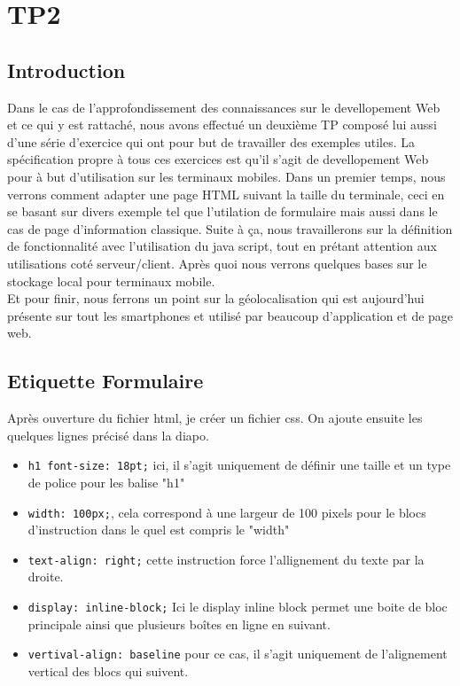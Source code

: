 \chapter{TP2}
\section{Introduction}
Dans le cas de l'approfondissement des connaissances sur le devellopement Web et ce qui y est rattaché, nous avons effectué un deuxième TP composé lui aussi d'une série d'exercice qui ont pour but de travailler des exemples utiles. La spécification propre à tous ces exercices est qu'il s'agit de devellopement Web pour à but d'utilisation sur les terminaux mobiles. Dans un premier temps, nous verrons comment adapter une page HTML suivant la taille du terminale, ceci en se basant sur divers exemple tel que l'utilation de formulaire mais aussi dans le cas de page d'information classique. Suite à ça, nous travaillerons sur la définition de fonctionnalité avec l'utilisation du java script, tout en prétant attention aux utilisations coté serveur/client. Après quoi nous verrons quelques bases sur le stockage local pour terminaux mobile.\\
Et pour finir, nous ferrons un point sur la géolocalisation qui est aujourd'hui présente sur tout les smartphones et utilisé par beaucoup d'application et de page web.

\section{Etiquette Formulaire}
Après ouverture du fichier html, je créer un fichier css. On ajoute ensuite les quelques lignes précisé dans la diapo.
\begin{itemize}
\item \texttt{h1 {font-size: 18pt;}} ici, il s'agit uniquement de définir une taille et un type de police pour les balise "h1"
\item \texttt{width: 100px;}, cela correspond à une largeur de 100 pixels pour le blocs d'instruction dans le quel est compris le "width"
\item \texttt{text-align: right;} cette instruction force l'allignement du texte par la droite.
\item \texttt{display: inline-block;} Ici le display inline block permet une boite de bloc principale ainsi que plusieurs boîtes en ligne en suivant.
\item \texttt{vertival-align: baseline} pour ce cas, il s'agit uniquement de l'alignement vertical des blocs qui suivent.
\end{itemize}

